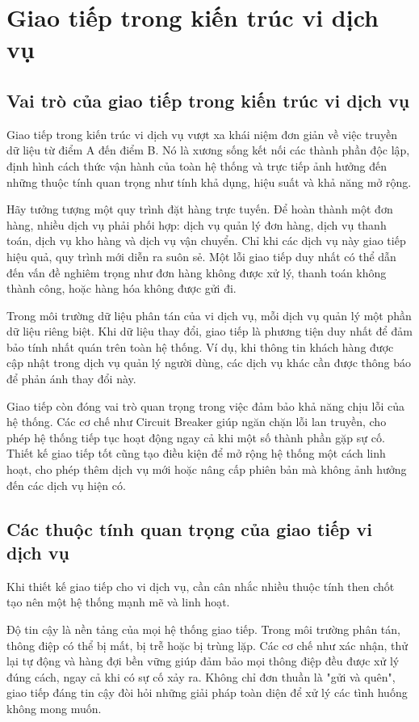 \section{Giao tiếp trong kiến trúc vi dịch vụ}

\subsection{Vai trò của giao tiếp trong kiến trúc vi dịch vụ}
Giao tiếp trong kiến trúc vi dịch vụ vượt xa khái niệm đơn giản về việc truyền dữ liệu từ điểm A đến điểm B. Nó là xương sống kết nối các thành phần độc lập, định hình cách thức vận hành của toàn hệ thống và trực tiếp ảnh hưởng đến những thuộc tính quan trọng như tính khả dụng, hiệu suất và khả năng mở rộng.

Hãy tưởng tượng một quy trình đặt hàng trực tuyến. Để hoàn thành một đơn hàng, nhiều dịch vụ phải phối hợp: dịch vụ quản lý đơn hàng, dịch vụ thanh toán, dịch vụ kho hàng và dịch vụ vận chuyển. Chỉ khi các dịch vụ này giao tiếp hiệu quả, quy trình mới diễn ra suôn sẻ. Một lỗi giao tiếp duy nhất có thể dẫn đến vấn đề nghiêm trọng như đơn hàng không được xử lý, thanh toán không thành công, hoặc hàng hóa không được gửi đi.

Trong môi trường dữ liệu phân tán của vi dịch vụ, mỗi dịch vụ quản lý một phần dữ liệu riêng biệt. Khi dữ liệu thay đổi, giao tiếp là phương tiện duy nhất để đảm bảo tính nhất quán trên toàn hệ thống. Ví dụ, khi thông tin khách hàng được cập nhật trong dịch vụ quản lý người dùng, các dịch vụ khác cần được thông báo để phản ánh thay đổi này.

Giao tiếp còn đóng vai trò quan trọng trong việc đảm bảo khả năng chịu lỗi của hệ thống. Các cơ chế như Circuit Breaker giúp ngăn chặn lỗi lan truyền, cho phép hệ thống tiếp tục hoạt động ngay cả khi một số thành phần gặp sự cố. Thiết kế giao tiếp tốt cũng tạo điều kiện để mở rộng hệ thống một cách linh hoạt, cho phép thêm dịch vụ mới hoặc nâng cấp phiên bản mà không ảnh hưởng đến các dịch vụ hiện có.

\subsection{Các thuộc tính quan trọng của giao tiếp vi dịch vụ}
Khi thiết kế giao tiếp cho vi dịch vụ, cần cân nhắc nhiều thuộc tính then chốt tạo nên một hệ thống mạnh mẽ và linh hoạt.

Độ tin cậy là nền tảng của mọi hệ thống giao tiếp. Trong môi trường phân tán, thông điệp có thể bị mất, bị trễ hoặc bị trùng lặp. Các cơ chế như xác nhận, thử lại tự động và hàng đợi bền vững giúp đảm bảo mọi thông điệp đều được xử lý đúng cách, ngay cả khi có sự cố xảy ra. Không chỉ đơn thuần là "gửi và quên", giao tiếp đáng tin cậy đòi hỏi những giải pháp toàn diện để xử lý các tình huống không mong muốn.

